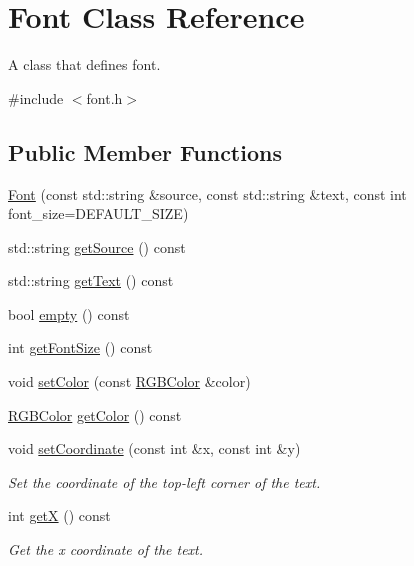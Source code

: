 \hypertarget{class_font}{}\section{Font Class Reference}
\label{class_font}


A class that defines font.  




{\ttfamily \#include $<$font.\+h$>$}

\subsection*{Public Member Functions}
\begin{DoxyCompactItemize}
\item 
\mbox{\hyperlink{class_font_a6ac2daa50eaf8fa5f58dcdf74ac3b25f}{Font}} (const std\+::string \&source, const std\+::string \&text, const int font\+\_\+size=D\+E\+F\+A\+U\+L\+T\+\_\+\+S\+I\+ZE)
\item 
std\+::string \mbox{\hyperlink{class_font_ac6bc1fec3b5df15f0c3e7fcc390921c3}{get\+Source}} () const
\item 
std\+::string \mbox{\hyperlink{class_font_aa98667de37350ff56f3555eef663792c}{get\+Text}} () const
\item 
bool \mbox{\hyperlink{class_font_add8908307abd40c4855c265582dad897}{empty}} () const
\item 
int \mbox{\hyperlink{class_font_a18fa6855561c84d79cea757128aabd08}{get\+Font\+Size}} () const
\item 
void \mbox{\hyperlink{class_font_af7bbc373536b3193fdee4c56e61f2463}{set\+Color}} (const \mbox{\hyperlink{class_r_g_b_color}{R\+G\+B\+Color}} \&color)
\item 
\mbox{\hyperlink{class_r_g_b_color}{R\+G\+B\+Color}} \mbox{\hyperlink{class_font_a1a8880f99db17a98294d9bfb8d5b6a25}{get\+Color}} () const
\item 
void \mbox{\hyperlink{class_font_a1c07aeed965112704d0872e9093c38a3}{set\+Coordinate}} (const int \&x, const int \&y)
\begin{DoxyCompactList}\small\item\em Set the coordinate of the top-\/left corner of the text. \end{DoxyCompactList}\item 
int \mbox{\hyperlink{class_font_a88e52dca0997ab9c21ac656d67259961}{getX}} () const
\begin{DoxyCompactList}\small\item\em Get the x coordinate of the text. \end{DoxyCompactList}\item 

\end{DoxyCompactItemize}
